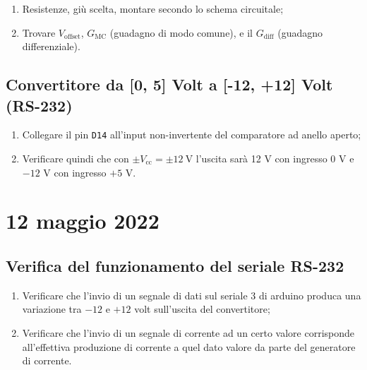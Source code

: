 \documentclass[fleqn,varvw,preprintnumbers,citeautoscript]{memo}
\begin{document}
\begin{enumerate}
    \item Resistenze, giù scelta, montare secondo lo schema circuitale;
    \item Trovare $V_\text{offset}$, $G_\text{MC}$ (guadagno di modo comune), e il $G_\text{diff}$ (guadagno differenziale). 
\end{enumerate}

\subsection{Convertitore da [0, 5] Volt a [-12, +12] Volt (RS-232)}

\begin{enumerate}
    \item Collegare il pin \verb-D14- all'input non-invertente del comparatore ad anello aperto;
    \item Verificare quindi che con $\pm V_\text{cc} = \pm\SI{12}{\volt}$ l'uscita sarà 12 V con ingresso 0 V e $-12$ V con ingresso $+5$ V.
\end{enumerate}

\section{12 maggio 2022}

\subsection{Verifica del funzionamento del seriale RS-232} 
\begin{enumerate}
    \item Verificare che l'invio di un segnale di dati sul seriale 3 di arduino produca una variazione tra $-12$ e $+12$ volt sull'uscita del convertitore;
    \item Verificare che l'invio di un segnale di corrente ad un certo valore corrisponde all'effettiva produzione di corrente a quel dato valore da parte del generatore di corrente.
\end{enumerate}
\end{document}
